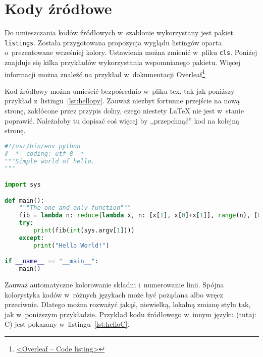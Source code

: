 
\section{Kody źródłowe}
Do umieszczania kodów źródłowych w~szablonie wykorzystany jest pakiet \texttt{listings}. Została przygotowana propozycja wyglądu listingów oparta o~prezentowane wcześniej kolory. Ustawienia można zmienić w~pliku \texttt{cls}. Poniżej znajduje się kilka przykładów wykorzystania wspomnianego pakietu. Więcej informacji można znaleźć na przykład w~dokumentacji Overleaf\footnote{\href{https://www.overleaf.com/learn/latex/code_listing}{<Overleaf -- Code listing>}}

Kod źródłowy można umieścić bezpośrednio w~pliku tex, tak jak poniższy przykład z~listingu~\ref{lst:hellopy}. Zauważ niezbyt fortunne przejście na nową stronę, zakłócone przez przypis dolny, czego niestety \LaTeX{} nie jest w~stanie poprawić. Należałoby tu dopisać coś więcej by ,,przepchnąć'' kod na kolejną stronę.

\begin{lstlisting}[language=Python,
    caption={Prosty program w~języku Python},
    label={lst:hellopy}]
#!/usr/bin/env python
# -*- coding: utf-8 -*-
"""Simple world of hello.
"""

import sys

def main():
    """The one and only function"""
    fib = lambda n: reduce(lambda x, n: [x[1], x[0]+x[1]], range(n), [0, 1])[0]
    try:
        print(fib(int(sys.argv[1])))
    except:
        print("Hello World!")

if __name__ == "__main__":
    main()
\end{lstlisting}

Zauważ automatyczne kolorowanie składni i~numerowanie linii. Spójna kolorystyka kodów w~różnych językach może być pożądana albo wręcz przeciwnie. Dlatego można rozważyć jakąś, niewielką, lokalną zmianę stylu tak, jak w~poniższym przykładzie. Przykład kodu źródłowego w~innym języku (tutaj: C) jest pokazany w~listingu~\ref{lst:helloC}. 

